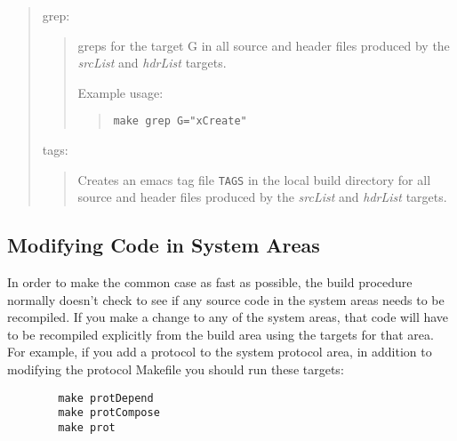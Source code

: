 \begin{quote}
grep:
\begin{quote}
	greps for the target G in all \xk{} source and header 
	files produced by the {\em srcList} and {\em hdrList} targets. 

	Example usage:

\begin{quote}
		{\tt make grep G="xCreate"}
\smallskip
\end{quote}
\end{quote}

tags:
\begin{quote}
	Creates an emacs tag file {\tt TAGS} in the local build directory 
	for all \xk{} source and header
	files produced by the {\em srcList} and {\em hdrList} targets. 
\smallskip
\end{quote}

\end{quote}


\subsection{Modifying Code in System Areas}

In order to make the common case as fast as possible, the \xk{}
build procedure normally doesn't check to see if any source code in
the system areas needs to be recompiled.  If you make a change to any
of the system areas, that code will have to be recompiled explicitly
from the build area using the targets for that area.  For example, if
you add a protocol to the system protocol area, in addition to
modifying the protocol Makefile you should run these targets:

\begin{verbatim}
        make protDepend	
        make protCompose	
        make prot
\end{verbatim}

